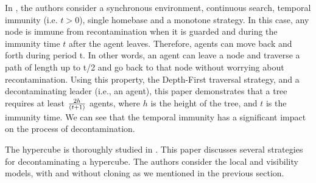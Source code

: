 In \cite{floetal13}, the authors consider a synchronous environment, continuous search, temporal immunity (i.e. $t>0$), single homebase and a monotone strategy. In this case, any node is immune from recontamination when it is guarded and during the immunity time $t$ after the agent leaves. Therefore, agents can move back and forth during period t. In other words, an agent can leave a node and traverse a path of length up to t/2 and go back to that node without worrying about recontamination. Using this property, the Depth-First traversal strategy, and a decontaminating leader (i.e., an agent), this paper demonstrates that a tree requires at least $2h\over(t+1)$ agents, where $h$ is the height of the tree, and $t$ is the immunity time. We can see that the temporal immunity has a significant impact on the process of decontamination. 


The hypercube is thoroughly studied in \cite{floetal20}. This paper discusses several strategies for decontaminating a hypercube. The authors consider the local and visibility models, with and without cloning as we mentioned in the previous section.







